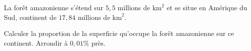 \begin{exo}{}
	La forêt amazonienne s'étend sur $5,5$ millions de $\text{km}^2$ et se situe en Amérique du Sud, continent de $17,84$ millions de $\text{km}^2$.


	Calculer la proportion de la superficie qu'occupe la forêt amazonienne sur ce continent. Arrondir à $0,01$\% près.
\end{exo}
